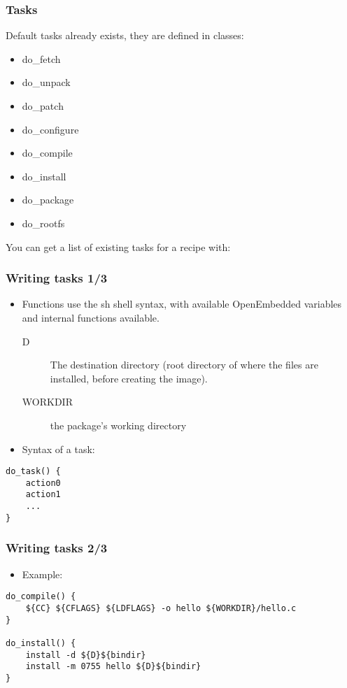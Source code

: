 \begin{frame}[fragile]
  \frametitle{Tasks}
  Default tasks already exists, they are defined in classes:
  \begin{itemize}
    \item do\_fetch
    \item do\_unpack
    \item do\_patch
    \item do\_configure
    \item do\_compile
    \item do\_install
    \item do\_package
    \item do\_rootfs
  \end{itemize}
  You can get a list of existing tasks for a recipe with:
\end{frame}

\begin{frame}[fragile]
  \frametitle{Writing tasks 1/3}
  \begin{itemize}
    \item Functions use the sh shell syntax, with available
      OpenEmbedded variables and internal functions available.
      \begin{description}
        \item[D] The destination directory (root directory of where
          the files are installed, before creating the image).
        \item[WORKDIR] the package's working directory
      \end{description}
    \item Syntax of a task:
  \end{itemize}
  \begin{block}{}
    \begin{verbatim}
do_task() {
    action0
    action1
    ...
}
    \end{verbatim}
  \end{block}
\end{frame}

\begin{frame}[fragile]
  \frametitle{Writing tasks 2/3}
  \begin{itemize}
    \item Example:
  \end{itemize}
  \begin{block}{}
    \begin{verbatim}
do_compile() {
    ${CC} ${CFLAGS} ${LDFLAGS} -o hello ${WORKDIR}/hello.c
}

do_install() {
    install -d ${D}${bindir}
    install -m 0755 hello ${D}${bindir}
}
    \end{verbatim}
  \end{block}
\end{frame}

